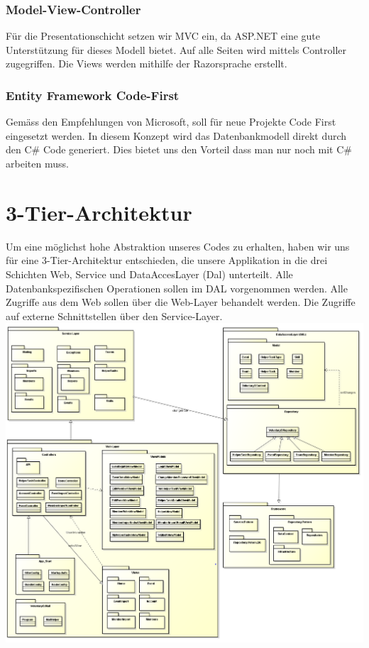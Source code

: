 		\subsubsection{Model-View-Controller}
		Für die Presentationschicht setzen wir MVC ein, da ASP.NET eine gute Unterstützung für dieses Modell bietet. Auf alle Seiten wird mittels Controller zugegriffen. Die Views werden mithilfe der Razorsprache erstellt.


		\subsubsection{Entity Framework Code-First}
		Gemäss den Empfehlungen von Microsoft, soll für neue Projekte Code First eingesetzt werden. In diesem Konzept wird das Datenbankmodell direkt durch den C\# Code generiert. Dies bietet uns den Vorteil dass man nur noch mit C\# arbeiten muss.

\section{3-Tier-Architektur}
	Um eine möglichst hohe Abstraktion unseres Codes zu erhalten, haben wir uns für eine 3-Tier-Architektur entschieden, die unsere Applikation in die drei Schichten Web, Service und DataAccesLayer (Dal) unterteilt. Alle Datenbankspezifischen Operationen sollen im DAL vorgenommen werden. Alle Zugriffe aus dem Web sollen über die Web-Layer behandelt werden. Die Zugriffe auf externe Schnittstellen über den Service-Layer.
	\includegraphics[width=\textwidth]{content/architekturdokumentation/images/LogischeArchitektur.png}

